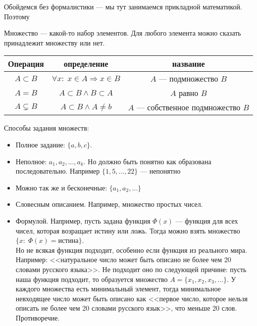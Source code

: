 Обойдемся без формалистики --- мы тут занимаемся прикладной математикой. Поэтому
 \begin{definition}
    Множество --- какой-то набор элементов. Для любого элемента можно сказать принадлежит множеству или нет.
\end{definition}
\begin{center}
    \begin{tabular}{| c | c | c |}
    \hline
    Операция & определение & название \\
    \hline
    \Large{$A \subset B$}          & $\forall x: \; x \in A \Rightarrow x \in B$ & $A$ --- подмножество $B$ \\
    \hline
    \Large{$A = B$}          & $A \subset B \land B \subset A$ & $A$ равно $B$ \\
    \hline
    \Large{$A \subsetneq B$} & $A \subset B \land A \neq b $ &  $A$ --- собственное подмножество  $B$ \\
    \hline
    \end{tabular}
\end{center}
Способы задания множеств:
\begin{itemize}
    \item Полное задание: $\{a,b,c\}$.
    \item  Неполное: $a_1,a_2,\ldots, a_k$. Но должно быть понятно как образована последовательно. Например $\{1,5,\ldots,22\}$ --- непонятно
    \item Можно так же и бесконечные: $\{a_1,a_2,\ldots\}$
    \item Словесным описанием. Например, множество простых чисел.
    \item Формулой. Например, пусть задана функция $\Phi(x)$ --- функция для всех чисел, которая возращает истину или ложь. Тогда можно взять множество  $\{x: \; \Phi(x) = \text{истина}\}$. \\
            Но не всякая функция подходит, особенно если функция из реального мира. Например: <<натуральное число может быть описано не более чем 20 словами русского языка>>. Не подходит оно по следующей причине: пусть наша функция подходит, то образуется множество  $A = \{x_1, x_2,x_3,\ldots\}$. У каждого множества есть минимальный элемент, тогда минимальное невходящее число может быть описано как <<первое число, которое нельзя описать не более чем 20 словами русского язык>>, что меньше 20 слов. Противоречие.
\end{itemize}
